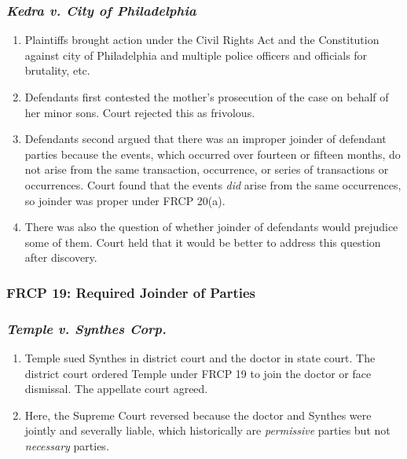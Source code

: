 \subsubsection{\emph{Kedra v. City of Philadelphia}}

\begin{enumerate}
    \item Plaintiffs brought action under the Civil Rights Act and the Constitution against city of Philadelphia and multiple police officers and officials for brutality, etc.
    \item Defendants first contested the mother's prosecution of the case on behalf of her minor sons. Court rejected this as frivolous.
    \item Defendants second argued that there was an improper joinder of defendant parties because the events, which occurred over fourteen or fifteen months, do not arise from the same transaction, occurrence, or series of transactions or occurrences. Court found that the events \emph{did} arise from the same occurrences, so joinder was proper under FRCP 20(a).
    \item There was also the question of whether joinder of defendants would prejudice some of them. Court held that it would be better to address this question after discovery.
\end{enumerate}

\subsubsection{FRCP 19: Required Joinder of Parties}


\subsubsection{\emph{Temple v. Synthes Corp.}}

\begin{enumerate}
    \item Temple sued Synthes in district court and the doctor in state court. The district court ordered Temple under FRCP 19 to join the doctor or face dismissal. The appellate court agreed.
    \item Here, the Supreme Court reversed because the doctor and Synthes were jointly and severally liable, which historically are \emph{permissive} parties but not \emph{necessary} parties.
\end{enumerate}

